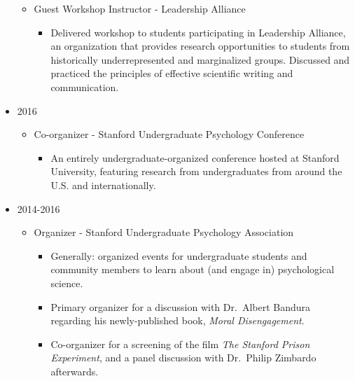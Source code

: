 \documentclass[
]{article}
\providecommand{\tightlist}{%
  \setlength{\itemsep}{0pt}\setlength{\parskip}{0pt}}
\begin{document}
\begin{itemize}
  \begin{itemize}
  \item
    Guest Workshop Instructor - Leadership Alliance

    \begin{itemize}
    \tightlist
    \item
      Delivered workshop to students participating in Leadership
      Alliance, an organization that provides research opportunities to
      students from historically underrepresented and marginalized
      groups. Discussed and practiced the principles of effective
      scientific writing and communication.
    \end{itemize}
  \end{itemize}
\item
  2016

  \begin{itemize}
  \item
    Co-organizer - Stanford Undergraduate Psychology Conference

    \begin{itemize}
    \tightlist
    \item
      An entirely undergraduate-organized conference hosted at Stanford
      University, featuring research from undergraduates from around the
      U.S. and internationally.
    \end{itemize}
  \end{itemize}
\item
  2014-2016

  \begin{itemize}
  \item
    Organizer - Stanford Undergraduate Psychology Association

    \begin{itemize}
    \item
      Generally: organized events for undergraduate students and
      community members to learn about (and engage in) psychological
      science.
    \item
      Primary organizer for a discussion with Dr.~Albert Bandura
      regarding his newly-published book, \emph{Moral Disengagement}.
    \item
      Co-organizer for a screening of the film \emph{The Stanford Prison
      Experiment}, and a panel discussion with Dr.~Philip Zimbardo
      afterwards.
    \end{itemize}
  \end{itemize}
\end{itemize}
\end{document}
